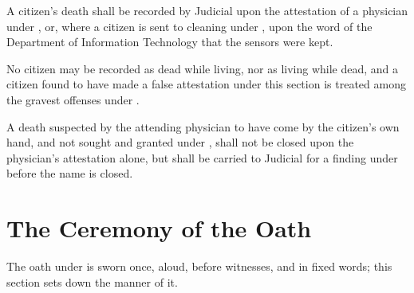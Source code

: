 \begin{clauses}
\item A citizen's death shall be recorded by Judicial upon the attestation of a physician under , or, where a citizen is sent to cleaning under , upon the word of the Department of Information Technology that the sensors were kept.
\item No citizen may be recorded as dead while living, nor as living while dead, and a citizen found to have made a false attestation under this section is treated among the gravest offenses under .
\item A death suspected by the attending physician to have come by the citizen's own hand, and not sought and granted under , shall not be closed upon the physician's attestation alone, but shall be carried to Judicial for a finding under  before the name is closed.
\end{clauses}

\section{The Ceremony of the Oath}
\label{sec:citizenship:ceremony-of-the-oath}

The oath under  is sworn once, aloud, before witnesses, and in fixed words; this section sets down the manner of it.

